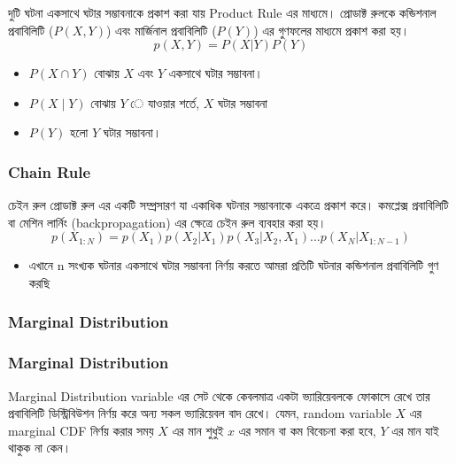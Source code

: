 \documentclass[graybox, envcountchap, twocolumn]{styles/svmult}
\begin{document}
 {\bengalifont দুটি ঘটনা একসাথে ঘটার সম্ভাবনাকে প্রকাশ করা যায় Product Rule এর মাধ্যমে।  প্রোডাক্ট রুলকে কন্ডিশনাল প্রবাবিলিটি ($P(X,Y)$) এবং মার্জিনাল প্রবাবিলিটি ($P(Y)$) এর গুণফলের মাধ্যমে প্রকাশ করা হয়।   }
\begin{equation}\label{eqn:product-rule}
p(X,Y) = P(X|Y) P(Y)
\end{equation}
\begin{itemize} 
    \item $P(X \cap Y)$ {\bengalifont বোঝায়} $X$ {\bengalifont এবং} $Y$ {\bengalifont একসাথে ঘটার সম্ভাবনা।} 
    \item $P(X \mid Y)$ {\bengalifont বোঝায়} $Y$ {ে যাওয়ার শর্তে,} $X$ {\bengalifont ঘটার সম্ভাবনা} 
    \item $P(Y)$ {\bengalifont হলো} $Y$ {\bengalifont ঘটার সম্ভাবনা।} \end{itemize}


\subsubsection{Chain Rule}
{\bengalifont চেইন রুল প্রোডাক্ট রুল এর একটি সম্প্রসারণ যা একাধিক ঘটনার সম্ভাবনাকে একত্রে প্রকাশ করে। কমপ্লেক্স প্রবাবিলিটি বা মেশিন লার্নিং (backpropagation) এর ক্ষেত্রে চেইন রুল ব্যবহার করা হয়। }
\begin{equation}
p(X_{1:N}) = p(X_1)p(X_2|X_1)p(X_3|X_2,X_1)...p(X_N|X_{1:N-1})
\label{eq:1}
\end{equation}

\begin{itemize}
    \item {\bengalifont এখানে 
    n সংখ্যক ঘটনার একসাথে ঘটার সম্ভাবনা নির্ণয় করতে আমরা প্রতিটি ঘটনার কন্ডিশনাল প্রবাবিলিটি গুণ করছি }
\end{itemize}

\subsubsection{Marginal Distribution}
\subsubsection{Marginal Distribution} {\bengalifont Marginal Distribution variable এর সেট থেকে কেবলমাত্র একটা ভ্যারিয়েবলকে ফোকাসে রেখে তার প্রবাবিলিটি ডিস্ট্রিবিউশন নির্ণয় করে অন্য সকল ভ্যারিয়েবল বাদ রেখে।  যেমন, random variable $X$ এর marginal CDF নির্ণয় করার সময় $X$ এর মান শুধুই $x$ এর সমান বা কম বিবেচনা করা হবে, $Y$ এর মান যাই  থাকুক না কেন।  }
\end{document}
